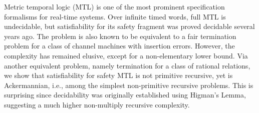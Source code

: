 Metric temporal logic (MTL) is one of the most prominent specification
formalisms for real-time systems. Over infinite timed words, full MTL
is undecidable, but satisfiability for its safety fragment was proved
decidable several years ago. The problem is also known to be
equivalent to a fair termination problem for a class of channel
machines with insertion errors. However, the complexity has remained
elusive, except for a non-elementary lower bound. Via another
equivalent problem, namely termination for a class of rational
relations, we show that satisfiability for safety MTL is not primitive
recursive, yet is Ackermannian, i.e., among the simplest non-primitive
recursive problems. This is surprising since decidability was
originally established using Higman's Lemma, suggesting a much higher
non-multiply recursive complexity.
